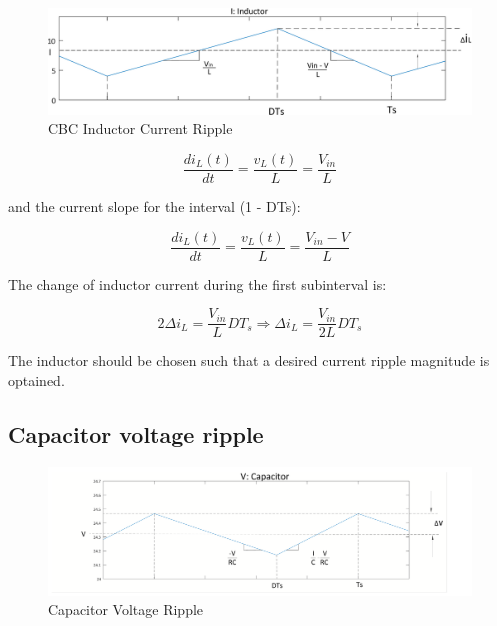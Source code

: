\begin{figure}[H]
   \centering
   \includegraphics[width=\textwidth]{figures/aConventionalBoost/InductorCurrent.pdf}
    \caption{CBC Inductor Current Ripple}
	\label{fig:CBC_InductorCurrent}
\end{figure}


\begin{equation}
	\frac{di_L(t)}{dt} = \frac{v_L(t)}{L} = \frac{V_{in}}{L}
	\label{eq:CBC_ICR1}
\end{equation}

and the current slope for the interval (1 - DTs):

\begin{equation}
	\frac{di_L(t)}{dt} = \frac{v_L(t)}{L} = \frac{V_{in} - V}{L}
	\label{eq:CBC_ICR2}
\end{equation}

The change of inductor current during the first subinterval is:

\begin{equation}
	2\Delta i_L = \frac{V_{in}}{L}DT_s \Rightarrow
  \Delta i_L = \frac{V_{in}}{2L}DT_s
	\label{eq:CBC_ICR3}
\end{equation}

The inductor should be chosen such that a desired current ripple magnitude is optained.

\subsection{Capacitor voltage ripple}\label{sec:CBC_CVR}

\begin{figure}[H]
   \centering
   \includegraphics[width=\textwidth]{figures/aConventionalBoost/CapacitorVoltage.pdf}
    \caption{Capacitor Voltage Ripple}
	\label{fig:CBC_CVR1}
\end{figure}

